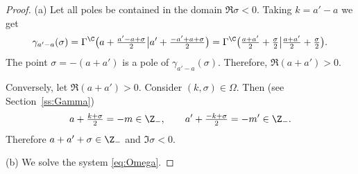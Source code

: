 \begin{proof} (a)
Let all poles be contained in the domain $\Re\sigma<0$.
Taking $k=a'-a$ we get
\[
\gamma_{a'-a}(\sigma)=\Gamma^\C
\big(a+\tfrac {a'-a+\sigma}2\big|a'+\tfrac {-a'+a+\sigma}2\big)=
\Gamma^\C\big(\tfrac{a+a'}2 +\tfrac{\sigma}{2}\big|\tfrac{a+a'}2
+\tfrac{\sigma}{2}\big).
\]
The point $\sigma= -(a+a')$ is a pole of $\gamma_{a'-a}(\sigma)$.
Therefore, $\Re(a+a')>0$.

Conversely, let $\Re(a+a')>0$.
Consider $(k,\sigma)\in \Omega$.
Then (see Section~\ref{ss:Gamma})
\begin{equation}
a+\tfrac{k+\sigma}2=-m\in \Z_-, \qquad a'+\tfrac{-k+\sigma}2=-m'\in \Z_-.
\label{eq:Omega}
\end{equation}
Therefore $a+a'+\sigma\in \Z_-$ and $\Im\sigma<0$.

(b) We solve the system \eqref{eq:Omega}.
\end{proof}

